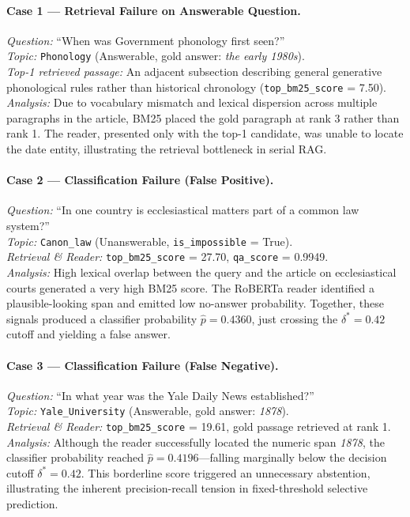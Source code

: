 \paragraph{Case 1 — Retrieval Failure on Answerable Question.}
\textit{Question:} ``When was Government phonology first seen?''\\
\textit{Topic:} \texttt{Phonology} (Answerable, gold answer: \emph{the early 1980s}).\\
\textit{Top-1 retrieved passage:} An adjacent subsection describing general generative phonological rules rather than historical chronology (\texttt{top\_bm25\_score} = 7.50).\\
\textit{Analysis:} Due to vocabulary mismatch and lexical dispersion across multiple paragraphs in the article, BM25 placed the gold paragraph at rank 3 rather than rank 1. The reader, presented only with the top-1 candidate, was unable to locate the date entity, illustrating the retrieval bottleneck in serial RAG.

\paragraph{Case 2 — Classification Failure (False Positive).}
\textit{Question:} ``In one country is ecclesiastical matters part of a common law system?''\\
\textit{Topic:} \texttt{Canon\_law} (Unanswerable, \texttt{is\_impossible} = True).\\
\textit{Retrieval \& Reader:} \texttt{top\_bm25\_score} = 27.70, \texttt{qa\_score} = 0.9949.\\
\textit{Analysis:} High lexical overlap between the query and the article on ecclesiastical courts generated a very high BM25 score. The RoBERTa reader identified a plausible-looking span and emitted low no-answer probability. Together, these signals produced a classifier probability $\hat{p} = 0.4360$, just crossing the $\delta^* = 0.42$ cutoff and yielding a false answer.

\paragraph{Case 3 — Classification Failure (False Negative).}
\textit{Question:} ``In what year was the Yale Daily News established?''\\
\textit{Topic:} \texttt{Yale\_University} (Answerable, gold answer: \emph{1878}).\\
\textit{Retrieval \& Reader:} \texttt{top\_bm25\_score} = 19.61, gold passage retrieved at rank 1.\\
\textit{Analysis:} Although the reader successfully located the numeric span \emph{1878}, the classifier probability reached $\hat{p} = 0.4196$—falling marginally below the decision cutoff $\delta^* = 0.42$. This borderline score triggered an unnecessary abstention, illustrating the inherent precision-recall tension in fixed-threshold selective prediction.

